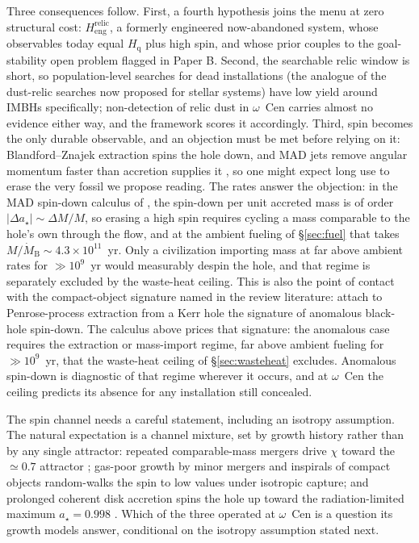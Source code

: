 \documentclass[11pt]{article}
\newcommand{\astar}{\ensuremath{a_\star}}
\newcommand{\ocen}{\ensuremath{\omega}~Cen}
\newcommand{\Hgas}{\ensuremath{H_{\mathrm{q}}}}
\begin{document}
Three consequences follow. First, a fourth hypothesis joins the menu at zero structural cost: \ensuremath{H_{\mathrm{eng}}^{\mathrm{relic}}}, a formerly engineered now-abandoned system, whose observables today equal \Hgas{} plus high spin, and whose prior couples to the goal-stability open problem flagged in Paper B. Second, the searchable relic window is short, so population-level searches for dead installations (the analogue of the dust-relic searches now proposed for stellar systems) have low yield around IMBHs specifically; non-detection of relic dust in \ocen{} carries almost no evidence either way, and the framework scores it accordingly. Third, spin becomes the only durable observable, and an objection must be met before relying on it: Blandford--Znajek extraction spins the hole down, and MAD jets remove angular momentum faster than accretion supplies it \citep{Narayan2022}, so one might expect long use to erase the very fossil we propose reading. The rates answer the objection: in the MAD spin-down calculus of \citet{Narayan2022}, the spin-down per unit accreted mass is of order $|\Delta\astar| \sim \Delta M/M$, so erasing a high spin requires cycling a mass comparable to the hole's own through the flow, and at the ambient fueling of \S\ref{sec:fuel} that takes $M/\dot{M}_{\mathrm{B}} \sim 4.3\times10^{11}$~yr. Only a civilization importing mass at far above ambient rates for $\gg 10^{9}$~yr would measurably despin the hole, and that regime is separately excluded by the waste-heat ceiling. This is also the point of contact with the compact-object signature named in the review literature: \citet{Vidal2026Review} attach to Penrose-process extraction from a Kerr hole the signature of anomalous black-hole spin-down. The calculus above prices that signature: the anomalous case requires the extraction or mass-import regime, far above ambient fueling for $\gg 10^{9}$~yr, that the waste-heat ceiling of \S\ref{sec:wasteheat} excludes. Anomalous spin-down is diagnostic of that regime wherever it occurs, and at \ocen{} the ceiling predicts its absence for any installation still concealed.

The spin channel needs a careful statement, including an isotropy assumption. The natural expectation is a channel mixture, set by growth history rather than by any single attractor: repeated comparable-mass mergers drive $\chi$ toward the $\simeq 0.7$ attractor \citep{Fishbach2017,GerosaBerti2017}; gas-poor growth by minor mergers and inspirals of compact objects random-walks the spin to low values under isotropic capture; and prolonged coherent disk accretion spins the hole up toward the radiation-limited maximum $\astar = 0.998$ \citep{Bardeen1970,Thorne1974}. Which of the three operated at \ocen{} is a question its growth models answer, conditional on the isotropy assumption stated next.
\end{document}

